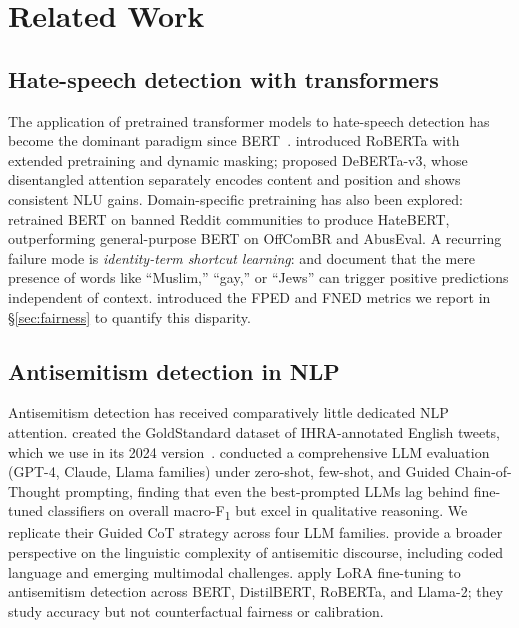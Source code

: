 \section{Related Work}
\label{sec:related}

\subsection{Hate-speech detection with transformers}

The application of pretrained transformer models to hate-speech detection has become the dominant paradigm since BERT~\citep{devlin2019bert}. \citet{liu2019roberta} introduced RoBERTa with extended pretraining and dynamic masking; \citet{he2023debertav3} proposed DeBERTa-v3, whose disentangled attention separately encodes content and position and shows consistent NLU gains. Domain-specific pretraining has also been explored: \citet{caselli2021hatebert} retrained BERT on banned Reddit communities to produce HateBERT, outperforming general-purpose BERT on OffComBR and AbusEval. A recurring failure mode is \emph{identity-term shortcut learning}: \citet{vidgen2020directions} and \citet{dixon2018measuring} document that the mere presence of words like ``Muslim,'' ``gay,'' or ``Jews'' can trigger positive predictions independent of context. \citet{dixon2018measuring} introduced the FPED and FNED metrics we report in \S\ref{sec:fairness} to quantify this disparity.

\subsection{Antisemitism detection in NLP}

Antisemitism detection has received comparatively little dedicated NLP attention. \citet{jikeli2023antisemitic} created the GoldStandard dataset of IHRA-annotated English tweets, which we use in its 2024 version~\citep{jikeli2024goldstandard}. \citet{patel2025evaluating} conducted a comprehensive LLM evaluation (GPT-4, Claude, Llama families) under zero-shot, few-shot, and Guided Chain-of-Thought prompting, finding that even the best-prompted LLMs lag behind fine-tuned classifiers on overall macro-F\textsubscript{1} but excel in qualitative reasoning. We replicate their Guided CoT strategy across four LLM families. \citet{becker2025decoding} provide a broader perspective on the linguistic complexity of antisemitic discourse, including coded language and emerging multimodal challenges. \citet{liu2024detecting} apply LoRA fine-tuning to antisemitism detection across BERT, DistilBERT, RoBERTa, and Llama-2; they study accuracy but not counterfactual fairness or calibration.

